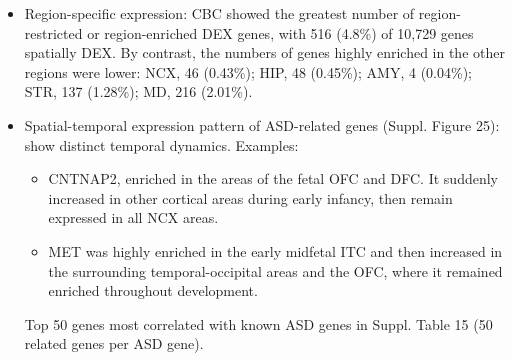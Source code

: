 \documentclass{report}
\begin{document}
\begin{itemize}
	\item Region-specific expression: CBC showed the greatest number of region-restricted or region-enriched DEX genes, with 516 (4.8\%) of 10,729 genes spatially DEX. By contrast, the numbers of genes highly enriched in the other regions were lower: NCX, 46 (0.43\%); HIP, 48 (0.45\%); AMY, 4 (0.04\%); STR, 137 (1.28\%); MD, 216 (2.01\%).
	
	\item Spatial-temporal expression pattern of ASD-related genes (Suppl. Figure 25): show distinct temporal dynamics. Examples:
	\begin{itemize}
		\item CNTNAP2, enriched in the areas of the fetal OFC and DFC. It suddenly increased in other cortical areas during early infancy, then remain expressed in all NCX areas. 
		\item MET was highly enriched in the early midfetal ITC and then increased in the surrounding temporal-occipital areas and the OFC, where it remained enriched throughout development. 
	\end{itemize}
	Top 50 genes most correlated with known ASD genes in Suppl. Table 15 (50 related genes per ASD gene).  
\end{itemize}
\end{document}
